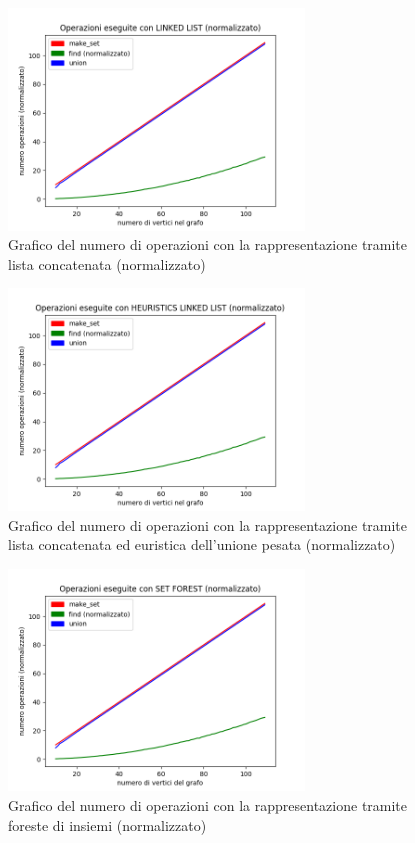 \documentclass[12pt]{article}
\begin{document}
    \begin{figure}[h]
        \includegraphics[width=0.7\textwidth]{images/results/count_ll_normalized.png}
        \caption{Grafico del numero di operazioni con la rappresentazione tramite lista concatenata (normalizzato)}
        \label{fig:count_ll_normalized}
    \end{figure}

    \begin{figure}[h]
        \includegraphics[width=0.7\textwidth]{images/results/count_llh_normalized.png}
        \caption{Grafico del numero di operazioni con la rappresentazione tramite lista concatenata ed euristica dell'unione pesata (normalizzato)}
        \label{fig:count_llh_normalized}
    \end{figure}

    \begin{figure}[h]
        \includegraphics[width=0.7\textwidth]{images/results/count_sf_normalized.png}
        \caption{Grafico del numero di operazioni con la rappresentazione tramite foreste di insiemi (normalizzato)}
        \label{fig:count_sf_normalized}
    \end{figure}
\end{document}
